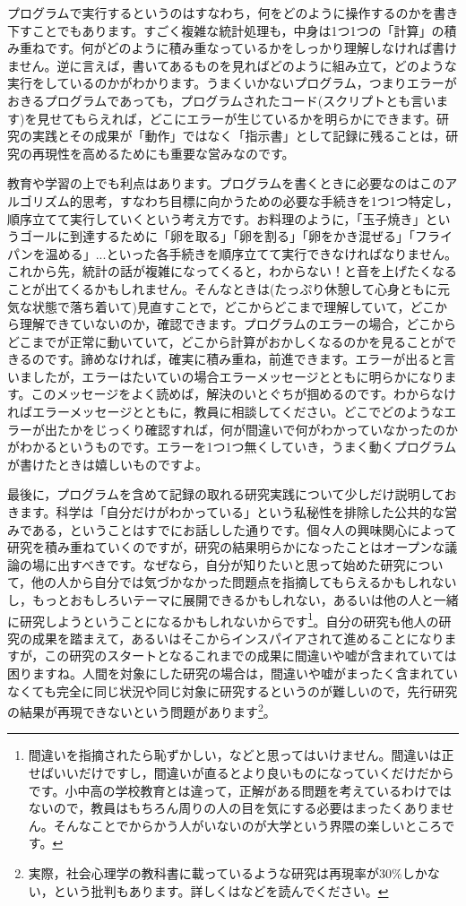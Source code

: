 \documentclass{ltjsbook}
\begin{document}
プログラムで実行するというのはすなわち，何をどのように操作するのかを書き下すことでもあります。すごく複雑な統計処理も，中身は1つ1つの「計算」の積み重ねです。何がどのように積み重なっているかをしっかり理解しなければ書けません。逆に言えば，書いてあるものを見ればどのように組み立て，どのような実行をしているのかがわかります。うまくいかないプログラム，つまりエラーがおきるプログラムであっても，プログラムされたコード(スクリプトとも言います)を見せてもらえれば，どこにエラーが生じているかを明らかにできます。研究の実践とその成果が「動作」ではなく「指示書」として記録に残ることは，研究の再現性を高めるためにも重要な営みなのです。

教育や学習の上でも利点はあります。プログラムを書くときに必要なのはこのアルゴリズム的思考，すなわち目標に向かうための必要な手続きを1つ1つ特定し，順序立てて実行していくという考え方です。お料理のように，「玉子焼き」というゴールに到達するために「卵を取る」「卵を割る」「卵をかき混ぜる」「フライパンを温める」...といった各手続きを順序立てて実行できなければなりません。これから先，統計の話が複雑になってくると，わからない！と音を上げたくなることが出てくるかもしれません。そんなときは(たっぷり休憩して心身ともに元気な状態で落ち着いて)見直すことで，どこからどこまで理解していて，どこから理解できていないのか，確認できます。プログラムのエラーの場合，どこからどこまでが正常に動いていて，どこから計算がおかしくなるのかを見ることができるのです。諦めなければ，確実に積み重ね，前進できます。エラーが出ると言いましたが，エラーはたいていの場合エラーメッセージとともに明らかになります。このメッセージをよく読めば，解決のいとぐちが掴めるのです。わからなければエラーメッセージとともに，教員に相談してください。どこでどのようなエラーが出たかをじっくり確認すれば，何が間違いで何がわかっていなかったのかがわかるというものです。エラーを1つ1つ無くしていき，うまく動くプログラムが書けたときは嬉しいものですよ。

最後に，プログラムを含めて記録の取れる研究実践について少しだけ説明しておきます。科学は「自分だけがわかっている」という私秘性を排除した公共的な営みである，ということはすでにお話しした通りです。個々人の興味関心によって研究を積み重ねていくのですが，研究の結果明らかになったことはオープンな議論の場に出すべきです。なぜなら，自分が知りたいと思って始めた研究について，他の人から自分では気づかなかった問題点を指摘してもらえるかもしれないし，もっとおもしろいテーマに展開できるかもしれない，あるいは他の人と一緒に研究しようということになるかもしれないからです\footnote{間違いを指摘されたら恥ずかしい，などと思ってはいけません。間違いは正せばいいだけですし，間違いが直るとより良いものになっていくだけだからです。小中高の学校教育とは違って，正解がある問題を考えているわけではないので，教員はもちろん周りの人の目を気にする必要はまったくありません。そんなことでからかう人がいないのが大学という界隈の楽しいところです。}。自分の研究も他人の研究の成果を踏まえて，あるいはそこからインスパイアされて進めることになりますが，この研究のスタートとなるこれまでの成果に間違いや嘘が含まれていては困りますね。人間を対象にした研究の場合は，間違いや嘘がまったく含まれていなくても完全に同じ状況や同じ対象に研究するというのが難しいので，先行研究の結果が再現できないという問題があります\footnote{実際，社会心理学の教科書に載っているような研究は再現率が30\%しかない，という批判もあります。詳しくは\textcite{Ikeda2016}などを読んでください。}。
\end{document}
